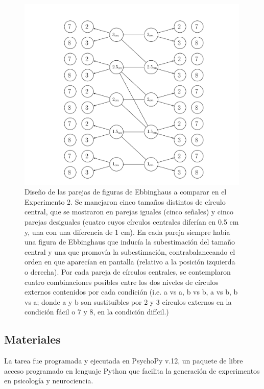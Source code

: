 \begin{itemize}
\begin{figure}[th]
\centering
\includegraphics[width=0.99\textwidth]{Figures/Estimulos_Experimento2} 
\decoRule
\caption[Diseño de Estimulos en el Experimento 2]{Diseño de las parejas  de figuras de Ebbinghaus a comparar en el Experimento 2. Se manejaron cinco tamaños distintos de círculo central, que se mostraron en parejas iguales (cinco señales) y cinco parejas desiguales (cuatro cuyos círculos centrales diferían en 0.5 cm y, una con una diferencia de 1 cm). En cada pareja siempre había una figura de Ebbinghaus que inducía la subestimación del tamaño central y una que promovía la subestimación, contrabalanceando el orden en que aparecían en pantalla (relativo a la posición izquierda o derecha). Por cada pareja de círculos centrales, se contemplaron cuatro combinaciones posibles entre los dos niveles de círculos externos contenidos por cada condición (i.e. a vs a, b vs b, a vs b, b vs a; donde a y b son sustituíbles por 2 y 3 círculos externos en la condición fácil o 7 y 8, en la condición difícil.)}
\label{fig:Exp_2}
\end{figure}
\end{itemize}



\subsection{Materiales}

La tarea fue programada y ejecutada en PsychoPy v.12, un paquete de libre acceso programado en lenguaje Python que facilita la generación de experimentos en psicología y neurociencia.

